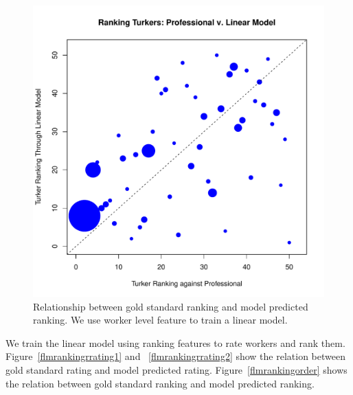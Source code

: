 \documentclass[11pt]{article}
\begin{document}
\begin{figure}[htbp]
  \centering
  \includegraphics[width=\linewidth]{Workerfeature/workerfeatureorderlm.pdf}
  \caption{Relationship between gold standard ranking and model predicted ranking. We use worker level feature to train a linear model. }
    \label{flmworkerorder}
\end{figure}
We train the linear model using ranking features to rate workers and rank them. Figure~\ref{flmrankingrrating1} and ~\ref{flmrankingrrating2} show the relation between gold standard rating and model predicted rating. Figure~\ref{flmrankingorder} shows the relation between gold standard ranking and model predicted ranking.
\end{document}
